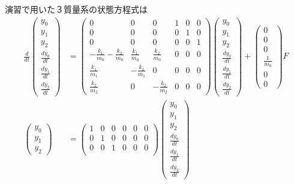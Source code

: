 \documentclass[a4paper,11pt]{jreport}
\begin{document}
演習で用いた３質量系の状態方程式は
\begin{align}
 \frac{d}{dt} \left(\begin{array}{c}
	         y_0 \\
		     y_1 \\
		     y_2 \\
		     \frac{dy_0}{dt} \\
		     \frac{dy_1}{dt} \\
		     \frac{dy_2}{dt}
		    \end{array}\right)
 &=
 \left(\begin{array}{cccccc}
        0 & 0 & 0 & 1 & 0 & 0      \\
        0 & 0 & 0 & 0 & 1 & 0      \\
        0 & 0 & 0 & 0 & 0 & 1      \\
	-\frac{k_1}{m_0} -\frac{k_2}{m_0}&  \frac{k_1}{m_0} &  \frac{k_2}{m_0} & 0 & 0 & 0 \\
	 \frac{k_1}{m_1}                & -\frac{k_1}{m_1} &  0               & 0 & 0 & 0 \\
	 \frac{k_2}{m_2}                &  0               & -\frac{k_2}{m_2} & 0 & 0 & 0 
       \end{array}\right)
 \left(\begin{array}{c}
	         y_0 \\
		     y_1 \\
		     y_2 \\
		     \frac{dy_0}{dt} \\
		     \frac{dy_1}{dt} \\
		     \frac{dy_2}{dt}
       \end{array}\right)
 +
 \left(\begin{array}{c}
        0 \\
        0 \\
        0 \\
	    \frac{1}{m_0} \\
	    0 \\
	    0 
       \end{array}\right)
        F
\nonumber
\\
 \left(\begin{array}{c}
	    y_0 \\
		y_1 \\
		y_2
       \end{array}\right)
 &=
 \left(\begin{array}{cccccc}
         1 & 0 & 0 & 0 & 0 & 0  \\
         0 & 1 & 0 & 0 & 0 & 0 \\
         0 & 0 & 1 & 0 & 0 & 0 \\
       \end{array}\right)
 \left(\begin{array}{c}
	         y_0 \\
		     y_1 \\
		     y_2 \\
		     \frac{dy_0}{dt} \\
		     \frac{dy_1}{dt} \\
		     \frac{dy_2}{dt}
       \end{array}\right)
\nonumber
\end{align}
\end{document}
